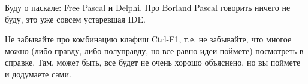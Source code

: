 




Буду о паскале: Free Pascal и Delphi. Про Borland Pascal говорить ничего не буду, это уже совсем 
устаревшая IDE.

Не забывайте про комбинацию клафиш Ctrl-F1, т.е. не забывайте, что многое можно (либо 
правду, либо полуправду, но все равно идеи поймете) посмотреть в справке. Там, может быть, все 
будет не очень хорошо объяснено, но вы поймете и додумаете сами.














